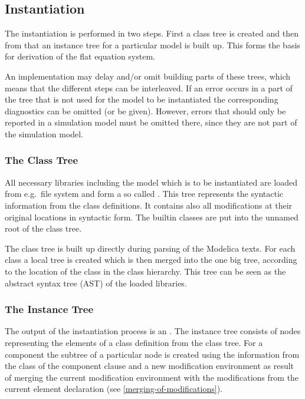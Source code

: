 \subsection{Instantiation}\label{instantiation}

The instantiation is performed in two steps. First a class tree is
created and then from that an instance tree for a particular model is
built up. This forms the basis for derivation of the flat equation
system.

An implementation may delay and/or omit building parts of these trees,
which means that the different steps can be interleaved. If an error
occurs in a part of the tree that is not used for the model to be
instantiated the corresponding diagnostics can be omitted (or be given).
However, errors that should only be reported in a simulation model must
be omitted there, since they are not part of the simulation model.

\subsubsection{The Class Tree}\label{the-class-tree}

All necessary libraries including the model which is to be instantiated
are loaded from e.g.\ file system and form a so called .
This tree represents the syntactic information from the
class definitions. It contains also all modifications at their original
locations in syntactic form. The builtin classes are put into the unnamed root of the class tree.

\begin{nonnormative}
The class tree is built up directly during parsing of the Modelica texts.  For each class a local tree is created which is then merged into the one big tree, according
to the location of the class in the class hierarchy.  This tree can be seen as the abstract syntax tree (AST) of the loaded libraries.
\end{nonnormative}

\subsubsection{The Instance Tree}\label{the-instance-tree}

The output of the instantiation process is an .
The instance tree consists of nodes representing the elements of a class
definition from the class tree. For a component the subtree of a
particular node is created using the information from the class of the
component clause and a new modification environment as result of merging
the current modification environment with the modifications from the
current element declaration (see \cref{merging-of-modifications}).

